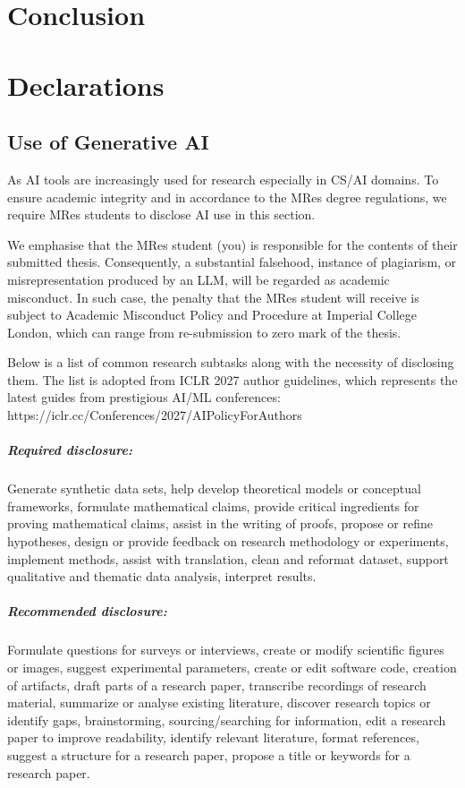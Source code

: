 \documentclass[12pt,twoside]{report}
\begin{document}
\chapter{Conclusion}


\chapter{Declarations}

\section{Use of Generative AI}
As AI tools are increasingly used for research especially in CS/AI domains. To ensure academic integrity and in accordance to the MRes degree regulations, we require MRes students to disclose AI use in this section. 

We emphasise that the MRes student (you) is responsible for the contents of their submitted thesis. Consequently, a substantial falsehood, instance of plagiarism, or misrepresentation produced by an LLM, will be regarded as academic misconduct. In such case, the penalty that the MRes student will receive is subject to Academic Misconduct Policy and Procedure at Imperial College London, which can range from re-submission to zero mark of the thesis.

Below is a list of common research subtasks along with the necessity of disclosing them. The list is adopted from ICLR 2027 author guidelines, which represents the latest guides from prestigious AI/ML conferences: \\
https://iclr.cc/Conferences/2027/AIPolicyForAuthors

\paragraph{Required disclosure:} Generate synthetic data sets, help develop theoretical models or conceptual frameworks, formulate mathematical claims, provide critical ingredients for proving mathematical claims, assist in the writing of proofs, propose or refine hypotheses, design or provide feedback on research  methodology or experiments, implement methods, assist with translation, clean and reformat dataset, support qualitative and thematic data analysis, interpret results. 

\paragraph{Recommended disclosure:} Formulate questions for surveys or interviews, create or modify scientific figures or images, suggest experimental parameters, create or edit software code,  creation of artifacts, draft parts of a research paper, transcribe recordings of research material, summarize or analyse existing literature, discover research topics or identify gaps, brainstorming, sourcing/searching for information, edit a research paper to improve readability, identify relevant literature, format references, suggest a structure for a research paper, propose a title or keywords for a research paper. \\
\end{document}
